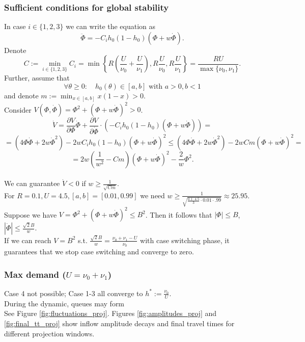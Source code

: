 \documentclass[12pt]{article}
\begin{document}
\subsubsection*{Sufficient conditions for global stability}
In case $i \in \{ 1, 2, 3 \}$ we can write the equation as
$$ \ddot{\Phi} = - C_i h_0(1-h_0)(\Phi + w \dot{\Phi}).$$ 
Denote 
$$ C := \min_{i \in \{ 1, 2, 3 \}} C_i = \min \left\{ R \left( \frac{U}{\nu_0} + \frac{U}{\nu_1} \right) , R \frac{U}{\nu_0} , R \frac{U}{\nu_1} \right\} = \frac{R U}{\max \{ \nu_0, \nu_1 \}}.$$
Further, assume that
 $$ \forall \theta \geq 0: \quad h_0(\theta) \in [a, b] \text{ with } a > 0, b < 1$$
  and denote  $m := \min_{x \in [a,b]} x(1-x) > 0 $.
\\
Consider $V(\Phi, \dot{\Phi}) = \Phi^2 + (\Phi + w \dot{\Phi}) ^2 >0 $.
$$ \dot{V} = \frac{\partial V}{\partial \Phi} \dot{\Phi} + \frac{\partial V}{\partial \dot{\Phi}} \cdot \left( -C_i  h_0(1-h_0)(\Phi + w \dot{\Phi}) \right)  = $$
$$ = \left( 4\Phi\dot{\Phi} + 2w\dot{\Phi}^2 \right) - 2w C_i h_0(1-h_0)(\Phi + w \dot{\Phi})^2 \leq \left(  4\Phi\dot{\Phi} + 2w\dot{\Phi}^2 \right) - 2wCm (\Phi + w \dot{\Phi})^2 = $$
$$ = 2w \left( \frac{1}{w^2} - Cm \right)  (\Phi + w \dot{\Phi})^2 - \frac{2}{w} \Phi^2  .$$
\\
We can guarantee $\dot{V} < 0$ if $w \geq \frac{1}{\sqrt{Cm}}$.
\\
For $R = 0.1, U = 4.5, [a,b] = [0.01, 0.99]$ we need $w \geq \frac{1}{\sqrt{ \frac{0.1 \cdot 4.5}{3} \cdot 0.01 \cdot .99}} \approx 25.95 $.
\\
Suppose we have $V = \Phi^2 + (\Phi + w\dot{\Phi})^2 \leq B^2$. Then it follows that $ |\Phi| \leq B $, $ | \dot{\Phi} | \leq \frac{\sqrt{2}B}{w} $. 
\\
If we can reach $V = B^2$ s.t. $\frac{\sqrt{2}B}{w} = \frac{\nu_0 + \nu_1 - U}{\nu_0} $ with case switching phase, it guarantees that  we stop case switching and converge to zero.

\newpage

\subsubsection*{Max demand ($U = \nu_0 + \nu_1$)}


Case 4 not possible; Case 1-3 all converge to $h^* := \frac{\nu_0}{U}$.
\\
During the dynamic, queues may form
\\
See Figure \ref{fig:fluctuations_proj}. Figures \ref{fig:amplitudes_proj} and \ref{fig:final_tt_proj} show inflow amplitude decays and final travel times for different projection windows.
\end{document}
